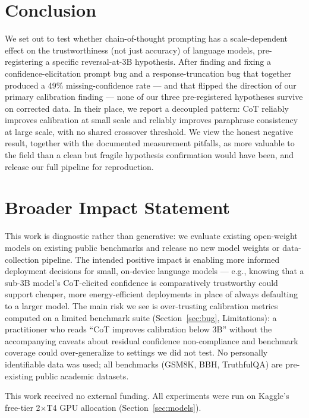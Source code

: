 \documentclass{article}
\begin{document}
\section{Conclusion}

We set out to test whether chain-of-thought prompting has a scale-dependent effect on the trustworthiness (not just accuracy) of language models, pre-registering a specific reversal-at-3B hypothesis. After finding and fixing a confidence-elicitation prompt bug and a response-truncation bug that together produced a 49\% missing-confidence rate --- and that flipped the direction of our primary calibration finding --- none of our three pre-registered hypotheses survive on corrected data. In their place, we report a decoupled pattern: CoT reliably improves calibration at small scale and reliably improves paraphrase consistency at large scale, with no shared crossover threshold. We view the honest negative result, together with the documented measurement pitfalls, as more valuable to the field than a clean but fragile hypothesis confirmation would have been, and release our full pipeline for reproduction.

\section*{Broader Impact Statement}

This work is diagnostic rather than generative: we evaluate existing open-weight models on existing public benchmarks and release no new model weights or data-collection pipeline. The intended positive impact is enabling more informed deployment decisions for small, on-device language models --- e.g., knowing that a sub-3B model's CoT-elicited confidence is comparatively trustworthy could support cheaper, more energy-efficient deployments in place of always defaulting to a larger model. The main risk we see is over-trusting calibration metrics computed on a limited benchmark suite (Section~\ref{sec:bug}, Limitations): a practitioner who reads ``CoT improves calibration below 3B'' without the accompanying caveats about residual confidence non-compliance and benchmark coverage could over-generalize to settings we did not test. No personally identifiable data was used; all benchmarks (GSM8K, BBH, TruthfulQA) are pre-existing public academic datasets.

\begin{ack}
This work received no external funding. All experiments were run on Kaggle's free-tier 2$\times$T4 GPU allocation (Section~\ref{sec:models}).
\end{ack}
\end{document}
